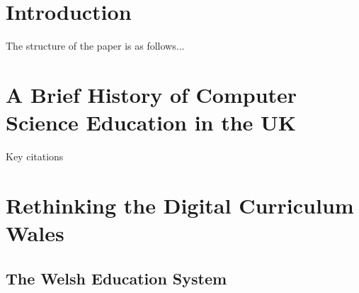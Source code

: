 \documentclass[sigconf]{acmart}
\begin{document}

\maketitle


\section{Introduction}

The structure of the paper is as follows...

\section{A Brief History of Computer Science Education in the UK}

Key citations~\cite{crick+sentance:2011,brown-et-al:sigcse2013,brown-et-al:toce2014,tryfonas+crick:petra2018}

\section{Rethinking the Digital Curriculum Wales}

\subsection{The Welsh Education System}
\end{document}
